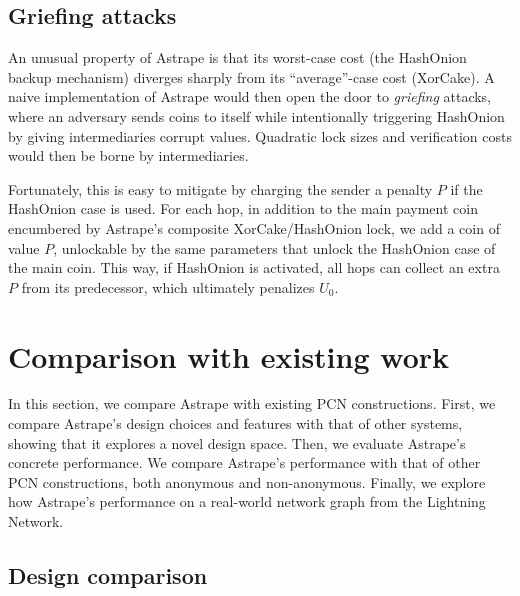 \documentclass[USenglish,oneside,twocolumn]{article}
\begin{document}
\subsection{Griefing attacks}

An unusual property of Astrape is that its worst-case cost (the HashOnion backup mechanism) diverges sharply from its ``average''-case cost (XorCake). A naive implementation of Astrape would then open the door to \emph{griefing} attacks, where an adversary sends coins to itself while intentionally triggering HashOnion by giving intermediaries corrupt values. Quadratic lock sizes and verification costs would then be borne by intermediaries.

Fortunately, this is easy to mitigate by charging the sender a penalty $P$ if the HashOnion case is used. For each hop, in addition to the main payment coin encumbered by Astrape's composite XorCake/HashOnion lock, we add a coin of value $P$, unlockable by the same parameters that unlock the HashOnion case of the main coin. This way, if HashOnion is activated, all hops can collect an extra $P$ from its predecessor, which ultimately penalizes $U_0$.

\section{Comparison with existing work} \label{sec:performance}

In this section, we compare Astrape with existing PCN constructions. First, we compare Astrape's design choices and features with that of other systems, showing that it explores a novel design space. Then, we evaluate Astrape's concrete performance. We compare Astrape's performance with that of other PCN constructions, both anonymous and non-anonymous. Finally, we explore how Astrape's performance on a real-world network graph from the Lightning Network.

\subsection{Design comparison}
\end{document}
